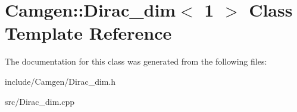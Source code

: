 \hypertarget{a00131}{}\section{Camgen\+:\+:Dirac\+\_\+dim$<$ 1 $>$ Class Template Reference}
\label{a00131}


The documentation for this class was generated from the following files\+:\begin{DoxyCompactItemize}
\item 
include/\+Camgen/Dirac\+\_\+dim.\+h\item 
src/Dirac\+\_\+dim.\+cpp\end{DoxyCompactItemize}
